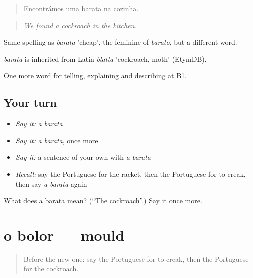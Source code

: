 \begin{quote}
Encontrámos uma barata na cozinha.
\end{quote}

\begin{quote}
\emph{We found a cockroach in the kitchen.}
\end{quote}

Same spelling as \emph{barata} 'cheap', the feminine of \emph{barato}, but a different word.

\begin{cousinweb}
\emph{barata} is inherited from Latin \emph{blatta} 'cockroach, moth' (EtymDB).
\end{cousinweb}

\begin{grammarlens}[title={What you've built}]
One more word for telling, explaining and describing at B1.
\end{grammarlens}

\subsection*{Your turn}
\begin{itemize}
\raggedright
  \item \emph{Say it:} \emph{a barata}
  \item \emph{Say it:} \emph{a barata}, once more
  \item \emph{Say it:} a sentence of your own with \emph{a barata}
  \item \emph{Recall:} say the Portuguese for the racket, then the Portuguese for to creak, then say \emph{a barata} again
\end{itemize}

\begin{tcolorbox}[breakable,colback=teal!4,colframe=teal!35!black,title={Before you move on}]
What does a barata mean? (\textquotedblleft{}The cockroach\textquotedblright{}.) Say it once more.
\end{tcolorbox}
\section[o bolor]{o bolor — mould}

\label{lesson:PT-C433-bolor}



\begin{quote}
Before the new one: say the Portuguese for to creak, then the Portuguese for the cockroach.
\end{quote}

